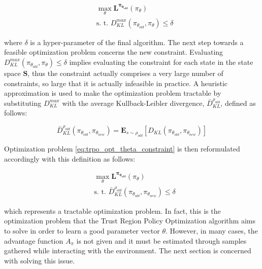                 \begin{align}
                    \label{eq:trpo_opt_theta_constraint}
                    &\max_{\theta} \mathbf{L^{\pi_{\theta_{old}}}}(\pi_{\theta}) \\
                    &\text{s. t. } D_{KL}^{max}(\pi_{\theta_{old}}, \pi_{\theta}) \leq \delta \nonumber
                \end{align}
                
                where $\delta$ is a hyper-parameter of the final algorithm. The next step towards a feasible optimization problem concerns the new constraint. Evaluating $D_{KL}^{max}(\pi_{\theta_{old}}, \pi_{\theta}) \leq \delta$ implies evaluating the constraint for each state in the state space $\mathbf{S}$, thus the constraint actually comprises a very large number of constraints, so large that it is actually infeasible in practice. A heuristic approximation is used to make the optimization problem tractable by substituting $D_{KL}^{max}$ with the average Kullback-Leibler divergence, $\bar{D}^{\rho_{old}}_{KL}$, defined as follows:
                
                \begin{definition}
                    \label{def:avg_kl_div}
                    \[ \bar{D}^{\rho_{old}}_{KL} (\pi_{\theta_{old}}, \pi_{\theta_{new}}) = \mathbf{E}_{s\sim\rho_{old}} \left[ D_{KL} (\pi_{\theta_{old}}, \pi_{\theta_{new}}) \right]\]
                \end{definition}
                
                Optimization problem \ref{eq:trpo_opt_theta_constraint} is then reformulated accordingly with this definition as follows:
                
                \begin{align}
                    \label{eq:trpo_opt_theta_avgkl}
                    &\max_{\theta} \mathbf{L^{\pi_{\theta_{old}}}}(\pi_{\theta}) \\
                    &\text{s. t. } \bar{D}^{\rho_{old}}_{KL} (\pi_{\theta_{old}}, \pi_{\theta_{new}}) \leq \delta \nonumber
                \end{align}
                
                which represents a tractable optimization problem. In fact, this is the optimization problem that the Trust Region Policy Optimization algorithm aims to solve in order to learn a good parameter vector $\theta$. However, in many cases, the advantage function $A_\pi$ is not given and it must be estimated through samples gathered while interacting with the environment. The next section is concerned with solving this issue.
                
